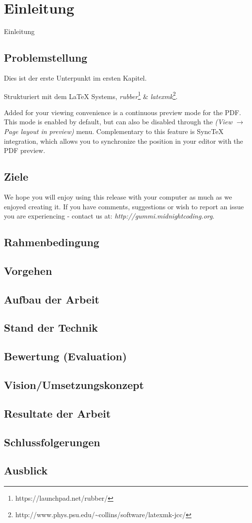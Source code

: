 \chapter{Einleitung}
Einleitung

\section{Problemstellung}

Dies ist der erste Unterpunkt im ersten Kapitel.

Strukturiert mit dem {\LaTeX} Systems, \emph{rubber}\footnote{https://launchpad.net/rubber/} \& \emph{latexmk}\footnote{http://www.phys.psu.edu/{\textasciitilde}collins/software/latexmk-jcc/}. 

Added for your viewing convenience is a continuous preview mode for the PDF. This mode is enabled by default, but can also be disabled through the \emph{(View $\rightarrow$ Page layout in preview)} menu. Complementary to this feature is SyncTeX integration, which allows you to synchronize the position in your editor with the PDF preview. 

\section{Ziele}
We hope you will enjoy using this release with your computer as much as we enjoyed creating it. If you have comments, suggestions or wish to report an issue you are experiencing - contact us at: \emph{http://gummi.midnightcoding.org}.

\section{Rahmenbedingung}

\section{Vorgehen}

\section{Aufbau der Arbeit}

\section{Stand der Technik}

\section{Bewertung (Evaluation)}

\section{Vision/Umsetzungskonzept}

\section{Resultate der Arbeit}

\section{Schlussfolgerungen}

\section{Ausblick}